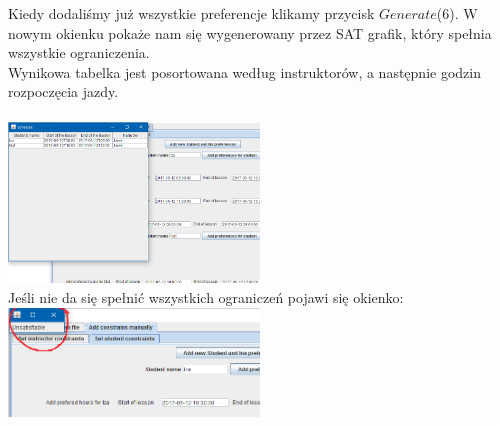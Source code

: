 \documentclass{article}
\begin{document}
Kiedy dodaliśmy już wszystkie preferencje klikamy przycisk $Generate$(6). W nowym okienku pokaże nam się wygenerowany przez SAT grafik, który spełnia wszystkie ograniczenia. \\ Wynikowa tabelka jest posortowana według instruktorów, a następnie godzin rozpoczęcia jazdy. \\ \\
\includegraphics[width=0.5\textwidth]{screen-schedule.png} \\
Jeśli nie da się spełnić wszystkich ograniczeń pojawi się okienko: \includegraphics[width=0.5\textwidth]{screen-unsatisfiable.png}
\end{document}
